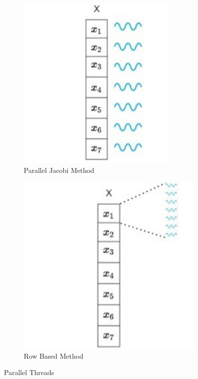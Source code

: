 \documentclass[11pt]{article}       %
\begin{document}
\begin{figure}[h]
\centering
\begin{subfigure}{.5\textwidth}
 \centering
 \includegraphics[width=0.85\textwidth]{Figures/jac_parallel}
 \caption{Parallel Jacobi Method}
 \label{fig:jac_par}
\end{subfigure}%
\begin{subfigure}{.5\textwidth}
 \centering
 \includegraphics[width=1\textwidth]{Figures/row_based}
 \caption{Row Based Method}
 \label{fig:row_based}
\end{subfigure}
\caption{Parallel Threads}
\end{figure}
\end{document}
